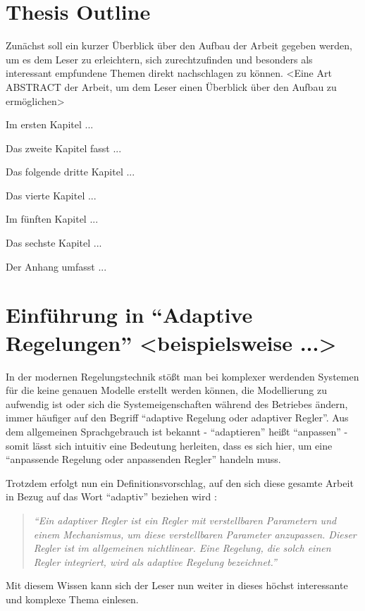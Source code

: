 \setcounter{equation}{0}


\chapter*{Thesis Outline}

 Zunächst
soll ein kurzer Überblick über den Aufbau der Arbeit gegeben werden,
um es dem Leser zu erleichtern, sich zurechtzufinden und besonders
als interessant empfundene Themen direkt nachschlagen zu können. <Eine
Art ABSTRACT der Arbeit, um dem Leser einen Überblick über den Aufbau
zu ermöglichen>

Im ersten Kapitel ... 

Das zweite Kapitel fasst ...

Das folgende dritte Kapitel ...

Das vierte Kapitel ...

Im fünften Kapitel ... 

Das sechste Kapitel ... 

Der Anhang umfasst ...

\clearpage{} \setcounter{page}{1}


\chapter{Einführung in {}``Adaptive Regelungen'' <beispielsweise ...>}

In der modernen Regelungstechnik stößt man bei komplexer werdenden
Systemen für die keine genauen Modelle erstellt werden können, die
Modellierung zu aufwendig ist oder sich die Systemeigenschaften während
des Betriebes ändern, immer häufiger auf den Begriff {}``adaptive
Regelung oder adaptiver Regler''. Aus dem allgemeinen Sprachgebrauch
ist bekannt - {}``adaptieren'' heißt {}``anpassen'' - somit lässt
sich intuitiv eine Bedeutung herleiten, dass es sich hier, um eine
{}``anpassende Regelung oder anpassenden Regler'' handeln muss. 

Trotzdem erfolgt nun ein Definitionsvorschlag, auf den sich diese
gesamte Arbeit in Bezug auf das Wort {}``adaptiv'' beziehen wird
\cite{Book_Adaptive-Control}:

\begin{quotation}
\textit{{}``Ein adaptiver Regler ist ein Regler mit verstellbaren
Parametern und einem Mechanismus, um diese verstellbaren Parameter
anzupassen. Dieser Regler ist im allgemeinen nichtlinear. Eine Regelung,
die solch einen Regler integriert, wird als adaptive Regelung bezeichnet.''}
\end{quotation}
Mit diesem Wissen kann sich der Leser nun weiter in dieses höchst
interessante und komplexe Thema einlesen. 


